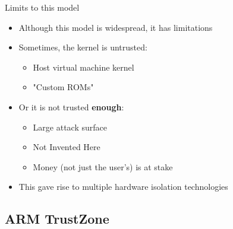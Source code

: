 \begin{frame}{Limits to this model}
  \begin{itemize}
    \item Although this model is widespread, it has limitations
    \item Sometimes, the kernel is untrusted:
    \begin{itemize}
      \item Host virtual machine kernel
      \item "Custom ROMs"
    \end{itemize}
    \item Or it is not trusted \textbf{enough}:
    \begin{itemize}
      \item Large attack surface
      \item Not Invented Here
      \item Money (not just the user's) is at stake
    \end{itemize}
    \item This gave rise to multiple hardware isolation technologies
  \end{itemize}
\end{frame}

\subsection{ARM TrustZone}



